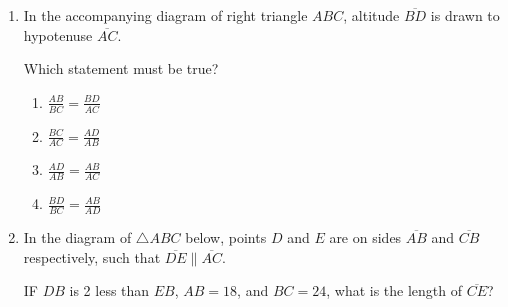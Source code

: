 \documentclass[12pt, oneside]{article}
\begin{document}
\begin{enumerate}[itemsep=1.7cm]
\item In the accompanying diagram of right triangle $ABC$, altitude $\overline{BD}$ is drawn to hypotenuse $\overline{AC}$.
  \begin{center}
  \end{center}
  Which statement must be true?
  \begin{multicols}{2}
    \begin{enumerate}
      \item $\displaystyle \frac{AB}{BC} = \frac{BD}{AC}$
      \item $\displaystyle \frac{BC}{AC} = \frac{AD}{AB}$
      \item $\displaystyle \frac{AD}{AB} = \frac{AB}{AC}$ 
      \item $\displaystyle \frac{BD}{BC} = \frac{AB}{AD}$
    \end{enumerate}
  \end{multicols}

\item In the diagram of $\triangle ABC$ below, points $D$ and $E$ are on sides $\overline{AB}$ and $\overline{CB}$ respectively, such that $\overline{DE} \parallel \overline{AC}$.
\begin{center}
\end{center}
IF $DB$ is 2 less than $EB$, $AB=18$, and $BC=24$, what is the length of $\overline{CE}$?

\end{enumerate}
\end{document}
